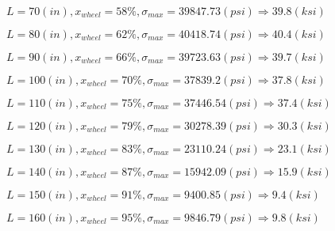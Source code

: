 \documentclass[11pt]{article}
\newcommand{\prompt}[4]{
        {\ttfamily\llap{{\color{#2}[#3]:\hspace{3pt}#4}}\vspace{-\baselineskip}}
    }
\begin{document}
    
 
            
\prompt{Out}{outcolor}{12}{}
    
    $L= 70(in), x_{wheel}=58 \%, \sigma_{max}=39847.73(psi) \Rightarrow 39.8(ksi)$

    
 
            
\prompt{Out}{outcolor}{12}{}
    
    $L= 80(in), x_{wheel}=62 \%, \sigma_{max}=40418.74(psi) \Rightarrow 40.4(ksi)$

    
 
            
\prompt{Out}{outcolor}{12}{}
    
    $L= 90(in), x_{wheel}=66 \%, \sigma_{max}=39723.63(psi) \Rightarrow 39.7(ksi)$

    
 
            
\prompt{Out}{outcolor}{12}{}
    
    $L= 100(in), x_{wheel}=70 \%, \sigma_{max}=37839.2(psi) \Rightarrow 37.8(ksi)$

    
 
            
\prompt{Out}{outcolor}{12}{}
    
    $L= 110(in), x_{wheel}=75 \%, \sigma_{max}=37446.54(psi) \Rightarrow 37.4(ksi)$

    
 
            
\prompt{Out}{outcolor}{12}{}
    
    $L= 120(in), x_{wheel}=79 \%, \sigma_{max}=30278.39(psi) \Rightarrow 30.3(ksi)$

    
 
            
\prompt{Out}{outcolor}{12}{}
    
    $L= 130(in), x_{wheel}=83 \%, \sigma_{max}=23110.24(psi) \Rightarrow 23.1(ksi)$

    
 
            
\prompt{Out}{outcolor}{12}{}
    
    $L= 140(in), x_{wheel}=87 \%, \sigma_{max}=15942.09(psi) \Rightarrow 15.9(ksi)$

    
 
            
\prompt{Out}{outcolor}{12}{}
    
    $L= 150(in), x_{wheel}=91 \%, \sigma_{max}=9400.85(psi) \Rightarrow 9.4(ksi)$

    
 
            
\prompt{Out}{outcolor}{12}{}
    
    $L= 160(in), x_{wheel}=95 \%, \sigma_{max}=9846.79(psi) \Rightarrow 9.8(ksi)$

    
 
\end{document}
